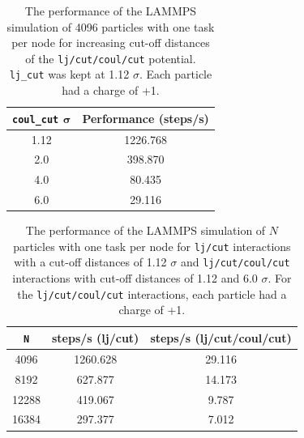 \documentclass[10pt,a4paper]{labreport}
\begin{document}
\begin{enumerate}
\begin{table}[htbp]
  \caption{The performance of the LAMMPS simulation of 4096 particles with one task per node for increasing cut-off distances of the \texttt{lj/cut/coul/cut} potential. \texttt{lj\_cut} was kept at 1.12 $\sigma$. Each particle had a charge of +1.}
  \label{tab:ass4_lammps-coul}
  \centering
  \begin{tabular}{cc} \hline
    \textbf{\texttt{coul\_cut}} $\bm{\sigma}$ & \textbf{Performance (steps/s)}\\
    \hline
    1.12                        & 1226.768                        \\
    2.0                         & 398.870                        \\
    4.0                         & 80.435                          \\
    6.0                         & 29.116                          \\ \hline
    \end{tabular}
\end{table}

\begin{table}[htb]
  \caption{The performance of the LAMMPS simulation of $N$ particles with one task per node for \texttt{lj/cut} interactions with a cut-off distances of 1.12 $\sigma$ and \texttt{lj/cut/coul/cut} interactions with cut-off distances of 1.12 and 6.0 $\sigma$. For the \texttt{lj/cut/coul/cut} interactions, each particle had a charge of +1.}
  \label{tab:ass4_lammps-npart}
  \centering
  \begin{tabular}{ccc} \hline
    \textbf{\texttt{N}} & \textbf{steps/s (lj/cut) }& \textbf{steps/s (lj/cut/coul/cut)}\\
    \hline
    4096                        & 1260.628      &       29.116           \\
    8192                         & 627.877       &      14.173           \\
    12288                         & 419.067      &      9.787              \\
    16384                         & 297.377       &     7.012              \\ \hline
    \end{tabular}
\end{table}


\end{enumerate}
\end{document}
